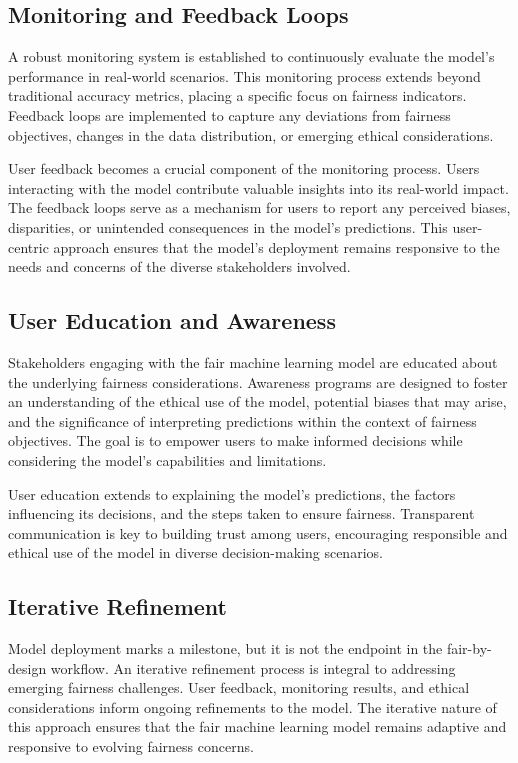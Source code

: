 \documentclass[12pt,a4paper,openright,twoside]{book}
\begin{document}
\subsection{Monitoring and Feedback Loops}

A robust monitoring system is established to continuously evaluate the model's performance in real-world scenarios. This monitoring process extends beyond traditional accuracy metrics, placing a specific focus on fairness indicators. Feedback loops are implemented to capture any deviations from fairness objectives, changes in the data distribution, or emerging ethical considerations.

User feedback becomes a crucial component of the monitoring process. Users interacting with the model contribute valuable insights into its real-world impact. The feedback loops serve as a mechanism for users to report any perceived biases, disparities, or unintended consequences in the model's predictions. This user-centric approach ensures that the model's deployment remains responsive to the needs and concerns of the diverse stakeholders involved.

\subsection{User Education and Awareness}

Stakeholders engaging with the fair machine learning model are educated about the underlying fairness considerations. Awareness programs are designed to foster an understanding of the ethical use of the model, potential biases that may arise, and the significance of interpreting predictions within the context of fairness objectives. The goal is to empower users to make informed decisions while considering the model's capabilities and limitations.

User education extends to explaining the model's predictions, the factors influencing its decisions, and the steps taken to ensure fairness. Transparent communication is key to building trust among users, encouraging responsible and ethical use of the model in diverse decision-making scenarios.

\subsection{Iterative Refinement}

Model deployment marks a milestone, but it is not the endpoint in the fair-by-design workflow. An iterative refinement process is integral to addressing emerging fairness challenges. User feedback, monitoring results, and ethical considerations inform ongoing refinements to the model. The iterative nature of this approach ensures that the fair machine learning model remains adaptive and responsive to evolving fairness concerns.
\end{document}
